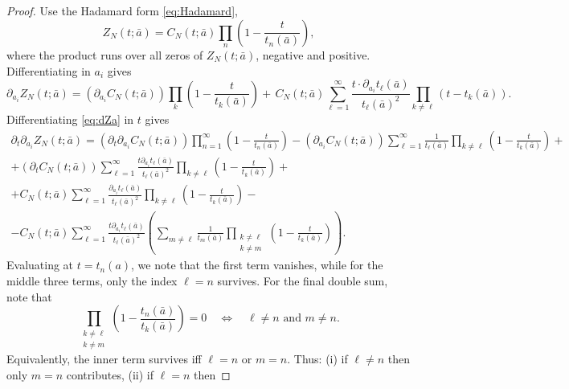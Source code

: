 \documentclass[12pt,reqno]{amsart}
\theoremstyle{plain}
\theoremstyle{definition}
\theoremstyle{remark}
\begin{document}
\begin{proof}
Use the Hadamard form \eqref{eq:Hadamard}, 
\begin{equation}\label{eq:hadamard-2}
Z_N(t;\bar a)=C_N(t ; \bar a)\prod_{n } \left (1-\frac{t}{t_n(\bar a)}\right ),
\end{equation}
where the product runs over all zeros of $Z_N(t; \bar a)$, negative and positive. 
Differentiating in $a_i$ gives
\begin{equation}\label{eq:dZa}
\partial_{a_i}Z_N(t;\bar a)
=\left (\partial_{a_i}C_N(t ; \bar a) \right) \prod_{k} \left (1-\frac{t}{t_k(\bar a)}\right ) +
\,C_N(t ; \bar a)\sum_{\ell=1}^{\infty} \frac{t \cdot \partial_{a_i} t_\ell(\bar a)}{t_{\ell}(\bar a)^2 }\prod_{k\neq \ell}(t-t_k(\bar a)).
\end{equation}
Differentiating \eqref{eq:dZa} in $t$ gives
\begin{multline}\label{eq:termB}
\partial_t\partial_{a_i}Z_N(t;\bar a)
= \left (\partial_t \partial_{a_i}C_N(t ; \bar a) \right) \prod_{n=1}^\infty \left (1-\frac{t}{t_n(\bar a)}\right )  -\left (\partial_{a_i}C_N(t ; \bar a) \right) \sum_{\ell =1}^{\infty}\frac{1}{t_{\ell} (\bar a) } \prod_{k \neq \ell } \left (1-\frac{t}{t_k(\bar a)}\right )  +\\ +(\partial_t C_N(t; \bar a))\sum_{\ell=1}^{\infty}\frac{t \partial_{a_i}t_\ell(\bar a)}{t_\ell(\bar a)^2}
\prod_{k\neq \ell} \left(1-\frac{t}{t_k(\bar a)}\right) + \\ + C_N(t;\bar a)\sum_{\ell=1}^{\infty}\frac{\partial_{a_i}t_\ell(\bar a)}{t_\ell(\bar a)^2}
\prod_{k\neq \ell}\left(1-\frac{t}{t_k(\bar a)}\right) -\\
-C_N(t; \bar a)\sum_{\ell=1}^{\infty}\frac{t \partial_{a_i}t_\ell(\bar a)}{t_\ell(\bar a)^2}
\left (\sum_{m\neq \ell}\frac{1}{t_m(\bar a)}
\prod_{\substack{k\neq \ell\\ k\neq m}}\left(1-\frac{t}{t_k(\bar a)}\right) \right ).
\end{multline}
Evaluating at \(t=t_n(a)\), we note that the first term vanishes, while for the middle three terms, only the index \(\ell=n\) survives. For the final double sum, note that
\begin{equation}
\prod_{\substack{k\neq \ell\\ k\neq m}} \left (1-\frac{t_n(\bar a)}{t_k (\bar a)} \right )=0
\quad\Longleftrightarrow\quad \ell\neq n \text{ and } m\neq n.
\end{equation}
Equivalently, the inner term survives iff \(\ell=n\) or \(m=n\). Thus:
(i) if \(\ell\neq n\) then only \(m=n\) contributes, (ii) if \(\ell=n\) then

\end{proof}
\end{document}
